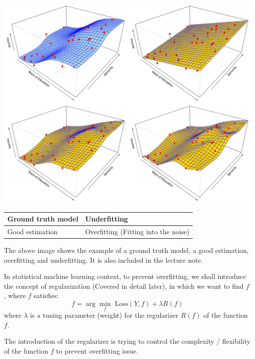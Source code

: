 \documentclass{article}
\theoremstyle{MyNonumberplain}
\theoremstyle{break}
\theoremstyle{break}
\theoremstyle{break}
\theoremstyle{break}
\begin{document}
\begin{center}
    \includegraphics*[scale=0.35]{img1.png}
\end{center}

\begin{table}[!h]
    \centering
    \begin{tabular}{|l|l|}
    \hline
    Ground truth model & Underfitting                         \\ \hline
    Good estimation    & Overfitting (Fitting into the noise) \\ \hline
    \end{tabular}
\end{table}

The above image shows the example of a ground truth model, a good estimation, overfitting and underfitting. It is also included in the lecture 
note. 


In statistical machine learning context, to prevent overfitting, we shall introduce the concept of regularization (Covered in detail later), in which we want to find $f$, where $f$ satisfies:
$$f=\arg\min_f\text{ Loss}(Y,f)+\lambda R(f)$$
where $\lambda$ is a tuning parameter (weight) for the regularizer $R(f)$ of the function $f$.

The introduction of the regularizer is trying to control the complexity / flexibility of the function $f$ to prevent overfitting issue.
\end{document}
